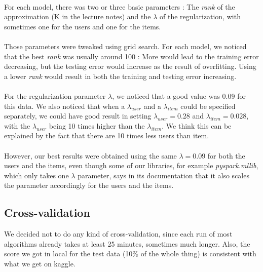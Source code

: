\documentclass[a4paper]{article}
\begin{document}
\paragraph{}
For each model, there was two or three basic parameters : The \textit{rank} of the approximation (K in the lecture notes) and the \(\lambda\) of the regularization, with sometimes one for the users and one for the items. 

\paragraph{}
Those parameters were tweaked using grid search. For each model, we noticed that the best \textit{rank} was usually around 100 : 
More would lead to the training error decreasing, but the testing error would increase as the result of overfitting. Using a lower \textit{rank} would result in both the training and testing error increasing.
\paragraph{}
For the regularization parameter \(\lambda\), we noticed that a good value was 0.09 for this data. We also noticed that when a \(\lambda_{user}\) and a \(\lambda_{item}\) could be specified separately, we could have good result in setting \(\lambda_{user} = 0.28\) and \(\lambda_{item} = 0.028\), with the \(\lambda_{user}\) being 10 times higher than the \(\lambda_{item}\). We think this can be explained by the fact that there are 10 times less users than item. 
\paragraph{}
However, our best results were obtained using the same \(\lambda = 0.09\) for both the users and the items, even though some of our libraries, for example \textit{pyspark.mllib}, which only takes one \(\lambda\) parameter, says in its documentation that it also scales the parameter accordingly for the users and the items.

\subsection{Cross-validation}
We decided not to do any kind of cross-validation, since each run of most algorithms already takes at least 25 minutes, sometimes much longer.
Also, the score we got in local for the test data (10\% of the whole thing) is consistent with what we get on kaggle.
\end{document}
